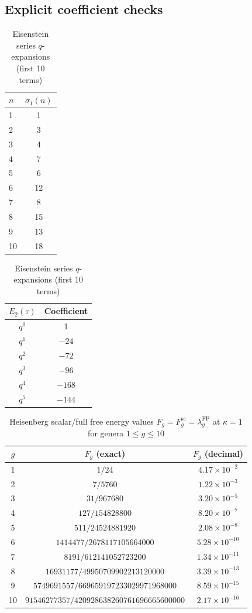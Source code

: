 \subsection{Explicit coefficient checks}
\label{subsec:explicit-coefficients-tables}

\begin{table}[ht]
\centering
\caption{Eisenstein series $q$-expansions (first 10 terms)}
\label{tab:eisenstein-q-expansions}
\begin{tabular}{|l|c|}
\hline
$n$ & $\sigma_1(n)$ \\
\hline
1 & 1 \\
2 & 3 \\
3 & 4 \\
4 & 7 \\
5 & 6 \\
6 & 12 \\
7 & 8 \\
8 & 15 \\
9 & 13 \\
10 & 18 \\
\hline
\end{tabular}
\quad
\begin{tabular}{|c|c|}
\hline
$E_2(\tau)$ & Coefficient \\
\hline
$q^0$ & 1 \\
$q^1$ & $-24$ \\
$q^2$ & $-72$ \\
$q^3$ & $-96$ \\
$q^4$ & $-168$ \\
$q^5$ & $-144$ \\
\hline
\end{tabular}
\end{table}

\begin{table}[ht]
\centering
\caption{Heisenberg scalar/full free energy values
$F_g=F_g^{\mathrm{sc}}=\lambda_g^{\mathrm{FP}}$ at $\kappa = 1$
for genera $1 \le g \le 10$}
\label{tab:free-energy-values}
\begin{tabular}{|c|c|c|}
\hline
$g$ & $F_g$ (exact) & $F_g$ (decimal) \\
\hline
1 & $1/24$ & $4.17 \times 10^{-2}$ \\
2 & $7/5760$ & $1.22 \times 10^{-3}$ \\
3 & $31/967680$ & $3.20 \times 10^{-5}$ \\
4 & $127/154828800$ & $8.20 \times 10^{-7}$ \\
5 & $511/24524881920$ & $2.08 \times 10^{-8}$ \\
6 & $1414477/2678117105664000$ & $5.28 \times 10^{-10}$ \\
7 & $8191/612141052723200$ & $1.34 \times 10^{-11}$ \\
8 & $16931177/49950709902213120000$ & $3.39 \times 10^{-13}$ \\
9 & $5749691557/669659197233029971968000$ & $8.59 \times 10^{-15}$ \\
10 & $91546277357/420928638260761696665600000$ & $2.17 \times 10^{-16}$ \\
\hline
\end{tabular}
\end{table}

